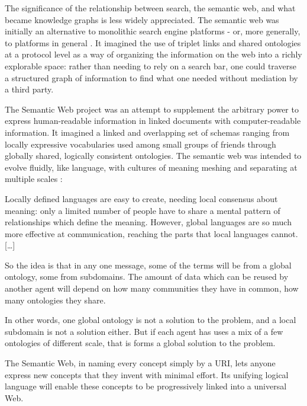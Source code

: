 The significance of the relationship between search, the semantic web,
and what became knowledge graphs is less widely appreciated. The
semantic web was initially an alternative to monolithic search engine
platforms - or, more generally, to platforms in general \cite{berners-leeSociallyAwareCloud2009} . It imagined the use of triplet
links and shared ontologies at a protocol level as a way of organizing
the information on the web into a richly explorable space: rather than
needing to rely on a search bar, one could traverse a structured graph
of information \cite{berners-leeLinkedData2006, berners-leeGoalsHumanDataInterface2010}  to find what one needed
without mediation by a third party.

The Semantic Web project was an attempt to supplement the arbitrary
power to express human-readable information in linked documents with
computer-readable information. It imagined a linked and overlapping set
of schemas ranging from locally expressive vocabularies used among small
groups of friends through globally shared, logically consistent
ontologies. The semantic web was intended to evolve fluidly, like
language, with cultures of meaning meshing and separating at multiple
scales \cite{berners-leeScalefreeNatureWeb1998, berners-leeSemanticWeb2001, berners-leeCulturesBoundaries2007} :

\begin{leftbar}
Locally defined languages are easy to create, needing local consensus
about meaning: only a limited number of people have to share a mental
pattern of relationships which define the meaning. However, global
languages are so much more effective at communication, reaching the
parts that local languages cannot. {[}\ldots{]}

So the idea is that in any one message, some of the terms will be from a
global ontology, some from subdomains. The amount of data which can be
reused by another agent will depend on how many communities they have in
common, how many ontologies they share.

In other words, one global ontology is not a solution to the problem,
and a local subdomain is not a solution either. But if each agent has
uses a mix of a few ontologies of different scale, that is forms a
global solution to the problem. \cite{berners-leeScalefreeNatureWeb1998} 
\end{leftbar}

\begin{leftbar}
The Semantic Web, in naming every concept simply by a URI, lets anyone
express new concepts that they invent with minimal effort. Its unifying
logical language will enable these concepts to be progressively linked
into a universal Web. \cite{berners-leeSemanticWeb2001} 
\end{leftbar}

